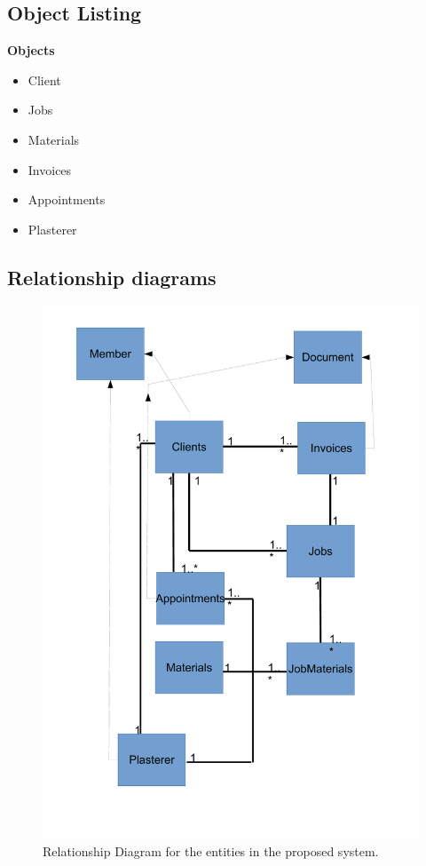\subsection{Object Listing}
\begin{flushleft}
\textbf{Objects}
	\begin{itemize}
		\item Client
		\item Jobs
		\item Materials
		\item Invoices
		\item Appointments
		\item Plasterer
	\end{itemize}
\end{flushleft}

\subsection{Relationship diagrams}

\begin{figure}[H]
\includegraphics[scale=0.5]{./Analysis/images/relationshipDiagramObjectAnalysis.pdf}
    \caption{Relationship Diagram for the entities in the proposed system.} \label{fig:proposed_system_relationship_diagram}
\end{figure}



